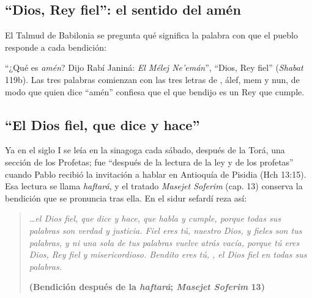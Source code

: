 \subsection{“Dios, Rey fiel”: el sentido del amén}
El Talmud de Babilonia se pregunta qué significa la palabra con que el pueblo responde a cada bendición:


``¿Qué es \emph{amén}? Dijo Rabí Janiná: \emph{El Mélej Ne'emán}'', ``Dios, Rey fiel'' (\emph{Shabat} 119b). Las tres palabras comienzan con las tres letras de , álef, mem y nun, de modo que quien dice ``amén'' confiesa que el que bendijo es un Rey que cumple.


\subsection{“El Dios fiel, que dice y hace”}
Ya en el siglo I se leía en la sinagoga cada sábado, después de la Torá, una sección de los Profetas; fue ``después de la lectura de la ley y de los profetas'' cuando Pablo recibió la invitación a hablar en Antioquía de Pisidia (Hch 13:15). Esa lectura se llama \emph{haftará}, y el tratado \emph{Masejet Soferim} (cap. 13) conserva la bendición que se pronuncia tras ella. En el sidur sefardí reza así:


\begin{quote}\itshape
\ldots{}el Dios fiel, que dice y hace, que habla y cumple, porque todas sus palabras son verdad y justicia. Fiel eres tú, \SENOR{} nuestro Dios, y fieles son tus palabras, y ni una sola de tus palabras vuelve atrás vacía, porque tú eres Dios, Rey fiel y misericordioso. Bendito eres tú, \SENOR, el Dios fiel en todas sus palabras.\par\hfill{\upshape\small\bfseries\textcolor{azul}{(Bendición después de la \emph{haftará}; \emph{Masejet Soferim} 13)}}
\end{quote}

